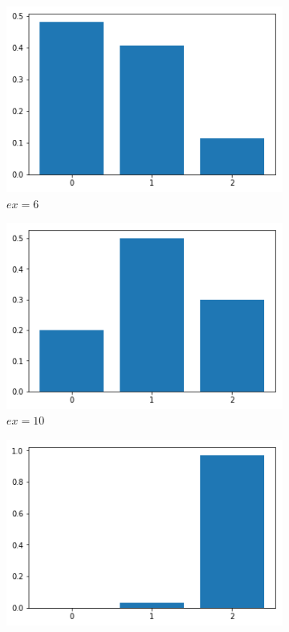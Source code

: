 \documentclass[a4paper,12pt]{article}
\theoremstyle{remark}
\begin{document}
	\begin{figure}[h]
		\begin{subfigure}{0.33\textwidth}
			\includegraphics[width=\linewidth]{nn3_damage_90_14_6.png}
			\caption{$ex=6$}
		\end{subfigure}
		\begin{subfigure}{0.33\textwidth}
			\includegraphics[width=\linewidth]{nn3_damage_90_14_10.png}
			\caption{$ex=10$}
		\end{subfigure}
		\begin{subfigure}{0.33\textwidth}
			\includegraphics[width=\linewidth]{nn3_damage_90_14_14.png}

\end{subfigure}
\end{figure}
\end{document}

